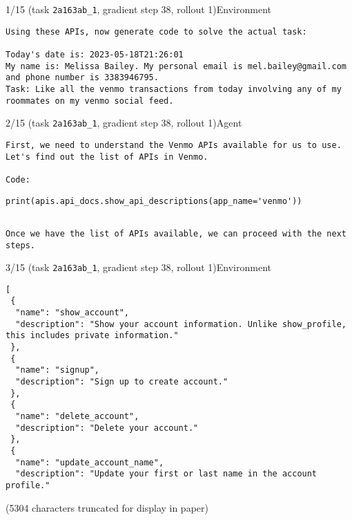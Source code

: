 
\hspace*{8mm}%
\begin{minipage}{0.95\linewidth}
\begin{user_message_box}{{1/15 (task \texttt{2a163ab\_1}, gradient step 38, rollout 1)\hfill Environment}}
\scriptsize
\begin{Verbatim}[breaklines]
Using these APIs, now generate code to solve the actual task:

Today's date is: 2023-05-18T21:26:01
My name is: Melissa Bailey. My personal email is mel.bailey@gmail.com and phone number is 3383946795.
Task: Like all the venmo transactions from today involving any of my roommates on my venmo social feed.
\end{Verbatim}
\end{user_message_box}
\end{minipage}

\begin{minipage}{0.95\linewidth}
\begin{assistant_message_box}{{2/15 (task \texttt{2a163ab\_1}, gradient step 38, rollout 1)\hfill Agent}}
\scriptsize
\begin{Verbatim}[breaklines]
First, we need to understand the Venmo APIs available for us to use. Let's find out the list of APIs in Venmo.

Code:

\end{Verbatim}
\begin{tcolorbox}[colback=codebgcolor,boxrule=0pt]\begin{Verbatim}[breaklines]
print(apis.api_docs.show_api_descriptions(app_name='venmo'))

\end{Verbatim}
\end{tcolorbox}\begin{Verbatim}[breaklines]

Once we have the list of APIs available, we can proceed with the next steps.
\end{Verbatim}
\end{assistant_message_box}
\end{minipage}

\hspace*{8mm}%
\begin{minipage}{0.95\linewidth}
\begin{user_message_box}{{3/15 (task \texttt{2a163ab\_1}, gradient step 38, rollout 1)\hfill Environment}}
\scriptsize
\begin{Verbatim}[breaklines]
[
 {
  "name": "show_account",
  "description": "Show your account information. Unlike show_profile, this includes private information."
 },
 {
  "name": "signup",
  "description": "Sign up to create account."
 },
 {
  "name": "delete_account",
  "description": "Delete your account."
 },
 {
  "name": "update_account_name",
  "description": "Update your first or last name in the account profile."
\end{Verbatim}
(5304 characters truncated for display in paper)\end{user_message_box}
\end{minipage}

